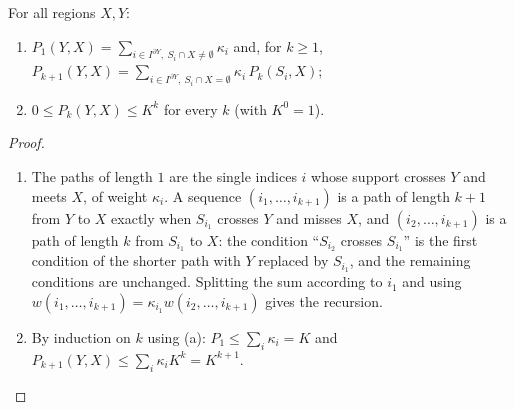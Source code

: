 \begin{proposition}\label{prop:pathcount}
For all regions $X,Y$:
\begin{enumerate}[label=(\alph*),nosep]
\item $P_1(Y,X)=\sum_{i\in I^{\partial Y},\ S_i\cap X\ne\emptyset}\kappa_i$ and, for $k\ge1$,
  $P_{k+1}(Y,X)=\sum_{i\in I^{\partial Y},\ S_i\cap X=\emptyset}\kappa_i\,P_k(S_i,X)$;
\item $0\le P_k(Y,X)\le K^k$ for every $k$ (with $K^0=1$).
\end{enumerate}
\end{proposition}

\begin{proof}
\begin{enumerate}[label=(\alph*),nosep]
\item The paths of length $1$ are the single indices $i$ whose support crosses $Y$ and meets $X$,
of weight $\kappa_i$. A sequence $(i_1,\dots,i_{k+1})$ is a path of length $k+1$ from $Y$ to $X$
exactly when $S_{i_1}$ crosses $Y$ and misses $X$, and $(i_2,\dots,i_{k+1})$ is a path of length
$k$ from $S_{i_1}$ to $X$: the condition ``$S_{i_2}$ crosses $S_{i_1}$'' is the first condition of
the shorter path with $Y$ replaced by $S_{i_1}$, and the remaining conditions are unchanged.
Splitting the sum according to $i_1$ and using $w(i_1,\dots,i_{k+1})=\kappa_{i_1}w(i_2,\dots,i_{k+1})$
gives the recursion.
\item By induction on $k$ using (a): $P_1\le\sum_i\kappa_i=K$ and
$P_{k+1}(Y,X)\le\sum_i\kappa_iK^k=K^{k+1}$.\qedhere
\end{enumerate}
\end{proof}

\begin{example}\label{ex:twosites}
\end{example}

